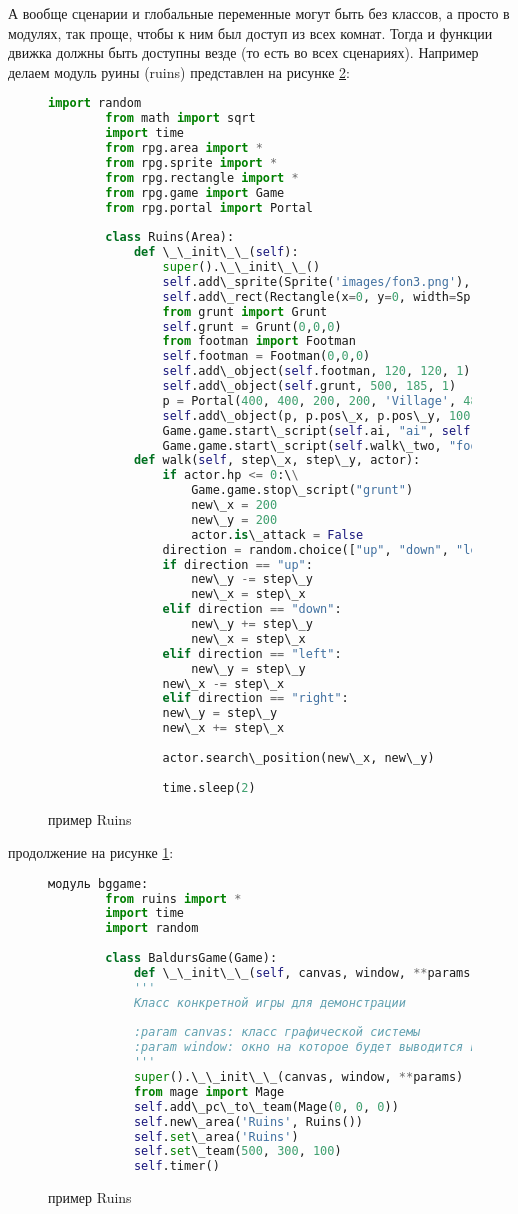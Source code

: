 А вообще сценарии и глобальные переменные могут быть без классов, а просто в модулях, так проще, чтобы к ним был доступ из всех комнат. Тогда и функции движка должны быть доступны везде (то есть во всех сценариях). Например делаем модуль руины (ruins) представлен на рисунке \ref{ruins:image}:
\begin{figure}[H]
	\begin{lstlisting}[language=Python]
		import random
		from math import sqrt
		import time
		from rpg.area import *
		from rpg.sprite import *
		from rpg.rectangle import *
		from rpg.game import Game
		from rpg.portal import Portal
		
		class Ruins(Area):
			def \_\_init\_\_(self):
				super().\_\_init\_\_()
				self.add\_sprite(Sprite('images/fon3.png'), 590, 400, 0)
				self.add\_rect(Rectangle(x=0, y=0, width=Sprite('images/fon3.png').image.width(), height=Sprite('images/fon3.png').image.height()))
				from grunt import Grunt
				self.grunt = Grunt(0,0,0)
				from footman import Footman
				self.footman = Footman(0,0,0)
				self.add\_object(self.footman, 120, 120, 1)
				self.add\_object(self.grunt, 500, 185, 1)
				p = Portal(400, 400, 200, 200, 'Village', 480, 100)
				self.add\_object(p, p.pos\_x, p.pos\_y, 100)
				Game.game.start\_script(self.ai, "ai", self.grunt)
				Game.game.start\_script(self.walk\_two, "footman", 50, 50)
			def walk(self, step\_x, step\_y, actor):
				if actor.hp <= 0:\\
					Game.game.stop\_script("grunt")
					new\_x = 200
					new\_y = 200
					actor.is\_attack = False
				direction = random.choice(["up", "down", "left", "right"])
				if direction == "up":
					new\_y -= step\_y
					new\_x = step\_x
				elif direction == "down":
					new\_y += step\_y
					new\_x = step\_x
				elif direction == "left":
					new\_y = step\_y
				new\_x -= step\_x
				elif direction == "right":
				new\_y = step\_y
				new\_x += step\_x
		
				actor.search\_position(new\_x, new\_y)
		
				time.sleep(2)
\end{lstlisting}  
\caption{пример Ruins}
\label{ruins2:image}
\end{figure}
продолжение на рисунке \ref{ruins2:image}:
\begin{figure}[H]
	\begin{lstlisting}[language=Python]		
		модуль bggame:
		from ruins import *
		import time
		import random
		
		class BaldursGame(Game):
			def \_\_init\_\_(self, canvas, window, **params):
			'''
			Класс конкретной игры для демонстрации
		
			:param canvas: класс графической системы
			:param window: окно на которое будет выводится игра
			'''
			super().\_\_init\_\_(canvas, window, **params)
			from mage import Mage
			self.add\_pc\_to\_team(Mage(0, 0, 0))
			self.new\_area('Ruins', Ruins())
			self.set\_area('Ruins')
			self.set\_team(500, 300, 100)
			self.timer()
	\end{lstlisting}  
	\caption{пример Ruins}
	\label{ruins:image}
\end{figure}


